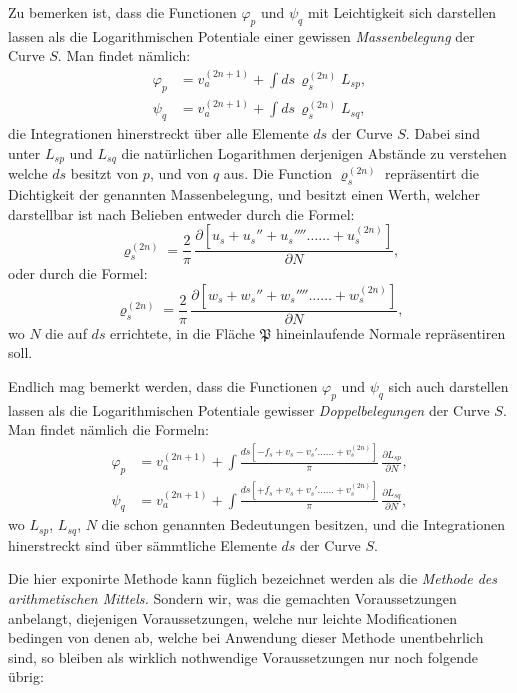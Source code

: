\documentclass{article}
\begin{document}
Zu bemerken ist, dass die Functionen $\varphi_{p}$ und $\psi_{q}$ mit Leichtigkeit sich darstellen lassen als die Logarithmischen Potentiale einer gewissen \emph{Massenbelegung} der Curve $S$. Man findet nämlich:
\[
\begin{aligned}
\varphi_{p} &= v_{a}^{(2n+1)}+\int ds\,\varrho_{s}^{(2n)}L_{sp},\\
\psi_{q} &= v_{a}^{(2n+1)}+\int ds\,\varrho_{s}^{(2n)}L_{sq},
\end{aligned}
\]
die Integrationen hinerstreckt über alle Elemente $ds$ der Curve $S$. Dabei sind unter $L_{sp}$ und $L_{sq}$ die natürlichen Logarithmen derjenigen Abstände zu verstehen welche $ds$ besitzt von $p$, und von $q$ aus. Die Function $\varrho_{s}^{(2n)}$ repräsentirt die Dichtigkeit der genannten Massenbelegung, und besitzt einen Werth, welcher darstellbar ist nach Belieben entweder durch die Formel:
\[
\varrho_{s}^{(2n)}=\frac{2}{\pi}\,\frac{\partial\left[u_{s}+u_{s}''+u_{s}''''\ldots\ldots+u_{s}^{(2n)}\right]}{\partial N},
\]
oder durch die Formel:
\[
\varrho_{s}^{(2n)}=\frac{2}{\pi}\,\frac{\partial\left[w_{s}+w_{s}''+w_{s}''''\ldots\ldots+w_{s}^{(2n)}\right]}{\partial N},
\]
wo $N$ die auf $ds$ errichtete, in die Fläche $\mathfrak{P}$ hineinlaufende Normale repräsentiren soll.

Endlich mag bemerkt werden, dass die Functionen $\varphi_{p}$ und $\psi_{q}$ sich auch darstellen lassen als die Logarithmischen Potentiale gewisser \emph{Doppelbelegungen} der Curve $S$. Man findet nämlich die Formeln:
\[
\begin{aligned}
\varphi_{p} &= v_{a}^{(2n+1)}+\int \frac{ds\left[-f_{s}+v_{s}-v_{s}'\ldots\ldots+v_{s}^{(2n)}\right]}{\pi}\,\frac{\partial L_{sp}}{\partial N},\\
\psi_{q} &= v_{a}^{(2n+1)}+\int \frac{ds\left[+f_{s}+v_{s}+v_{s}'\ldots\ldots+v_{s}^{(2n)}\right]}{\pi}\,\frac{\partial L_{sq}}{\partial N},
\end{aligned}
\]
wo $L_{sp}$, $L_{sq}$, $N$ die schon genannten Bedeutungen besitzen, und die Integrationen hinerstreckt sind über sämmtliche Elemente $ds$ der Curve $S$.

Die hier exponirte Methode kann füglich bezeichnet werden als die \emph{Methode des arithmetischen Mittels.} Sondern wir, was die gemachten Voraussetzungen anbelangt, diejenigen Voraussetzungen, welche nur leichte Modificationen bedingen von denen ab, welche bei Anwendung dieser Methode unentbehrlich sind, so bleiben als wirklich nothwendige Voraussetzungen nur noch folgende übrig:
\end{document}
